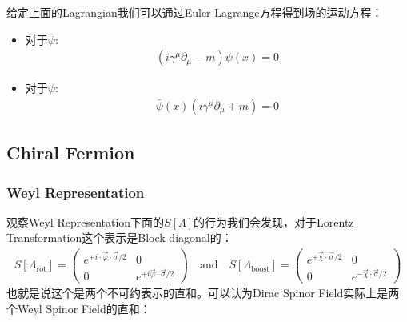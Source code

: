 
给定上面的Lagrangian我们可以通过Euler-Lagrange方程得到场的运动方程：
\begin{itemize}
  \item 对于$ \bar{\psi} $:
    \begin{align}
      (i\gamma^\mu\partial_\mu - m)\psi(x) = 0
    \end{align}
  \item 对于$ \psi $:
    \begin{align}
      \bar{\psi}(x)(i\gamma^\mu\partial_\mu + m) = 0
    \end{align}
\end{itemize}


\subsection{Chiral Fermion}

\subsubsection{Weyl Representation}


观察Weyl Representation下面的$ S[\Lambda] $的行为我们会发现，对于Lorentz Transformation这个表示是Block diagonal的：
\begin{align}
  S[\Lambda_{\mathrm{rot}}]=\begin{pmatrix}e^{+i\cdot\vec{\varphi}\cdot\vec{\sigma}/2}&0\\0&e^{+i\vec{\varphi}\cdot\vec{\sigma}/2}\end{pmatrix}\quad\mathrm{and}\quad S[\Lambda_{\mathrm{boost}}]=\begin{pmatrix}e^{+\vec{\chi}\cdot\vec{\sigma}/2}&0\\0&e^{-\vec{\chi}\cdot\vec{\sigma}/2}\end{pmatrix}
\end{align}
也就是说这个是两个不可约表示的直和。可以认为Dirac Spinor Field实际上是两个Weyl Spinor Field的直和：

